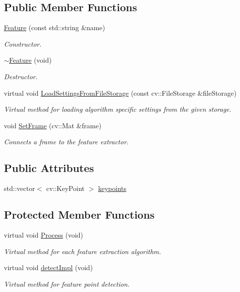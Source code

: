 \subsection*{Public Member Functions}
\begin{DoxyCompactItemize}
\item 
\hyperlink{class_feature_a020e991990bb6ca904015ffa7902d55f}{Feature} (const std\-::string \&name)
\begin{DoxyCompactList}\small\item\em Constructor. \end{DoxyCompactList}\item 
\hyperlink{class_feature_ab6dfcfe22cc71c7b45a61d991b4ff775}{$\sim$\-Feature} (void)
\begin{DoxyCompactList}\small\item\em Destructor. \end{DoxyCompactList}\item 
virtual void \hyperlink{class_feature_a2ce73a191961cbd5f8fe8bc47f4e08c1}{Load\-Settings\-From\-File\-Storage} (const cv\-::\-File\-Storage \&file\-Storage)
\begin{DoxyCompactList}\small\item\em Virtual method for loading algorithm specific settings from the given storage. \end{DoxyCompactList}\item 
void \hyperlink{class_feature_a72f15196406066e9758c8c1b8be9318d}{Set\-Frame} (cv\-::\-Mat \&frame)
\begin{DoxyCompactList}\small\item\em Connects a frame to the feature extractor. \end{DoxyCompactList}\end{DoxyCompactItemize}
\subsection*{Public Attributes}
\begin{DoxyCompactItemize}
\item 
std\-::vector$<$ cv\-::\-Key\-Point $>$ \hyperlink{class_feature_a7e1fc96f926cad9da3db0397a99c0079}{keypoints}
\end{DoxyCompactItemize}
\subsection*{Protected Member Functions}
\begin{DoxyCompactItemize}
\item 
virtual void \hyperlink{class_feature_ad9e3aebe506fc936c6ad18f9fc9543db}{Process} (void)
\begin{DoxyCompactList}\small\item\em Virtual method for each feature extraction algorithm. \end{DoxyCompactList}\item 
virtual void \hyperlink{class_feature_aa9b4e7ae8880145fd0eb02b4646a0a74}{detect\-Impl} (void)
\begin{DoxyCompactList}\small\item\em Virtual method for feature point detection. \end{DoxyCompactList}\end{DoxyCompactItemize}
